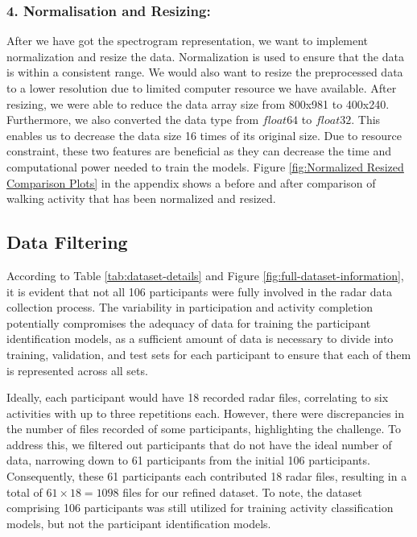 \documentclass{l4proj}
\begin{document}
\subsubsection{4. Normalisation and Resizing:}
After we have got the spectrogram representation, we want to implement normalization and resize the data. Normalization is used to ensure that the data is within a consistent range. We would also want to resize the preprocessed data to a lower resolution due to limited computer resource we have available. After resizing, we were able to reduce the data array size from 800x981 to 400x240. Furthermore, we also converted the data type from $float64$ to $float32$. This enables us to decrease the data size 16 times of its original size. Due to resource constraint, these two features are beneficial as they can decrease the time and computational power needed to train the models. Figure \ref{fig:Normalized Resized Comparison Plots} in the appendix shows a before and after comparison of walking activity that has been normalized and resized.

\subsection{Data Filtering} \label{data_filtering}
According to Table \ref{tab:dataset-details} and Figure \ref{fig:full-dataset-information}, it is evident that not all 106 participants were fully involved in the radar data collection process. The variability in participation and activity completion potentially compromises the adequacy of data for training the participant identification models, as a sufficient amount of data is necessary to divide into training, validation, and test sets for each participant to ensure that each of them is represented across all sets.

Ideally, each participant would have 18 recorded radar files, correlating to six activities with up to three repetitions each. However, there were discrepancies in the number of files recorded of some participants, highlighting the challenge. To address this, we filtered out participants that do not have the ideal number of data, narrowing down to 61 participants from the initial 106 participants. Consequently, these 61 participants each contributed 18 radar files, resulting in a total of $61 \times 18 = 1098$ files for our refined dataset. To note, the dataset comprising 106 participants was still utilized for training activity classification models, but not the participant identification models.
\end{document}
